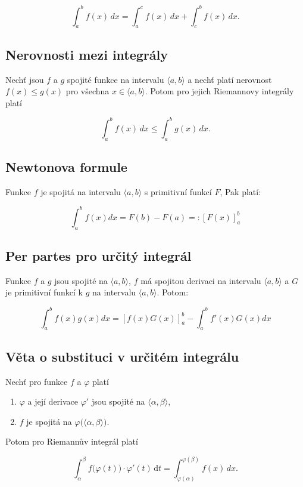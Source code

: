 \[ \int_a^b f(x)\,dx  = \int_a^c f(x)\,dx + \int_c^b f(x)\,dx. \]

\subsection*{Nerovnosti mezi integrály}

Nechť jsou $f$ a $g$ spojité funkce na intervalu $\langle a,b \rangle$ a nechť
platí nerovnost $f(x) \leq g(x)$ pro všechna $x\in\langle a,b \rangle$. Potom
pro jejich Riemannovy integrály platí

\[ \int_a^b f(x)\,dx \leq \int_a^b g(x)\,dx. \]

\subsection*{Newtonova formule}

Funkce $f$ je spojitá na intervalu $\langle a, b \rangle$ s primitivní funkcí
$F$, Pak platí:

\[ \int_a^b f(x) dx = F(b) - F(a) =:\left[ F(x) \right]_a^b \]

\subsection*{Per partes pro určitý integrál}

Funkce $f$ a $g$ jsou spojité na $\langle a, b \rangle$, $f$ má spojitou
derivaci na intervalu $\langle a, b \rangle$ a $G$ je primitivní funkcí k $g$
na intervalu $\langle a, b \rangle$. Potom:

\[ \int_a^b f(x)g(x) dx =  \left[ f(x)G(x) \right]_a^b - \int_a^b f'(x)G(x) dx\]

\subsection*{Věta o substituci v určitém integrálu}

Nechť pro funkce $f$ a $\varphi$ platí

\begin{enumerate}
    \item $\varphi$ a její derivace $\varphi'$ jsou spojité na $\langle \alpha,\beta \rangle$,
    \item $f$ je spojitá na $\varphi\big(\langle\alpha,\beta\rangle\big)$.
\end{enumerate}

\noindent Potom pro Riemannův integrál platí

\[ \int_\alpha^\beta f\big(\varphi(t)\big)\cdot\varphi'(t) \,\mathrm{d}t = \int_{\varphi(\alpha)}^{\varphi(\beta)}
    f(x)\,dx. \]

